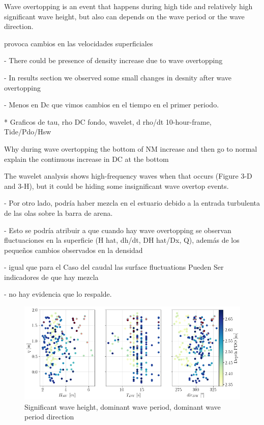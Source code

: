 \documentclass[tesis.tex]{subfiles}
\begin{document}
Wave overtopping is an event that happens during high tide and relatively high significant wave height, but also can depends on the wave period or the wave direction. 


provoca cambios en las velocidades superficiales


- There could be presence of density increase due to wave overtopping 

- In results section we observed some small changes in desnity after wave overtopping 

- Menos en Dc que vimos cambios en el tiempo en el primer periodo.

* Graficos de tau, rho DC fondo, wavelet, d rho/dt 10-hour-frame, Tide/Pdo/Hsw

Why during wave overtopping the bottom of NM increase and then go to normal
explain the  continuous increase in DC at the bottom

The wavelet analysis shows high-frequency waves when that occurs (Figure 3-D and 3-H), but it could be hiding some insignificant wave overtop events.

- Por otro lado, podría haber mezcla en el estuario debido a la entrada turbulenta de las olas sobre la barra de arena.

- Esto se podría atribuir a que cuando hay wave overtopping se observan fluctuaciones en la superficie (H hat, dh/dt, DH hat/Dx, Q), además de los pequeños cambios observados en la densidad

- igual que para el Caso del caudal las surface fluctuations Pueden Ser indicadores de que hay mezcla

- no hay evidencia que lo respalde.

\begin{figure}[h!]
    \centering
    \includegraphics[width=\textwidth]{Imagenes/WO.png}
    \caption{Significant wave height,  dominant wave period, dominant wave period direction}
    \label{fig:WO}
\end{figure}
\end{document}
